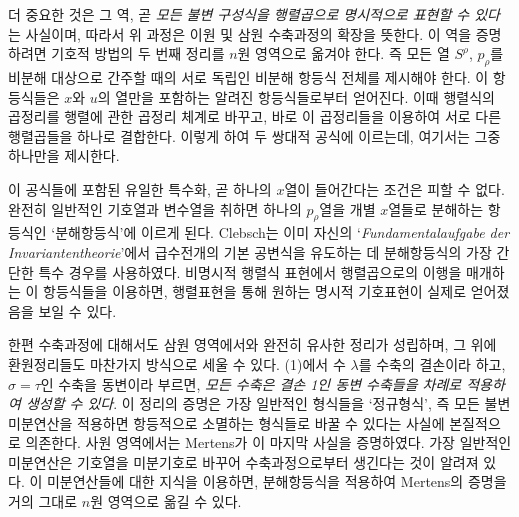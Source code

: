 더 중요한 것은 그 역, 곧 \emph{모든 불변 구성식을 행렬곱으로 명시적으로 표현할 수 있다}는 사실이며, 따라서 위 과정은 이원 및 삼원 수축과정의 확장을 뜻한다. 이 역을 증명하려면 기호적 방법의 두 번째 정리를 \(n\)원 영역으로 옮겨야 한다. 즉 모든 열 \(S^\rho\), \(p_\rho\)를 비분해 대상으로 간주할 때의 서로 독립인 비분해 항등식 전체를 제시해야 한다. 이 항등식들은 \(x\)와 \(u\)의 열만을 포함하는 알려진 항등식들로부터 얻어진다. 이때 행렬식의 곱정리를 행렬에 관한 곱정리 체계로 바꾸고, 바로 이 곱정리들을 이용하여 서로 다른 행렬곱들을 하나로 결합한다. 이렇게 하여 두 쌍대적 공식에 이르는데, 여기서는 그중 하나만을 제시한다.

이 공식들에 포함된 유일한 특수화, 곧 하나의 \(x\)열이 들어간다는 조건은 피할 수 없다. 완전히 일반적인 기호열과 변수열을 취하면 하나의 \(p_\rho\)열을 개별 \(x\)열들로 분해하는 항등식인 ‘분해항등식’에 이르게 된다. Clebsch는 이미 자신의 ‘\emph{Fundamentalaufgabe der Invariantentheorie}’에서 급수전개의 기본 공변식을 유도하는 데 분해항등식의 가장 간단한 특수 경우를 사용하였다. 비명시적 행렬식 표현에서 행렬곱으로의 이행을 매개하는 이 항등식들을 이용하면, 행렬표현을 통해 원하는 명시적 기호표현이 실제로 얻어졌음을 보일 수 있다.

한편 수축과정에 대해서도 삼원 영역에서와 완전히 유사한 정리가 성립하며, 그 위에 환원정리들도 마찬가지 방식으로 세울 수 있다. (1)에서 수 \(\lambda\)를 수축의 결손이라 하고, \(\sigma=\tau\)인 수축을 동변이라 부르면, \emph{모든 수축은 결손 1인 동변 수축들을 차례로 적용하여 생성할 수 있다}. 이 정리의 증명은 가장 일반적인 형식들을 ‘정규형식’, 즉 모든 불변 미분연산을 적용하면 항등적으로 소멸하는 형식들로 바꿀 수 있다는 사실에 본질적으로 의존한다. 사원 영역에서는 Mertens가 이 마지막 사실을 증명하였다. 가장 일반적인 미분연산은 기호열을 미분기호로 바꾸어 수축과정으로부터 생긴다는 것이 알려져 있다. 이 미분연산들에 대한 지식을 이용하면, 분해항등식을 적용하여 Mertens의 증명을 거의 그대로 \(n\)원 영역으로 옮길 수 있다.
